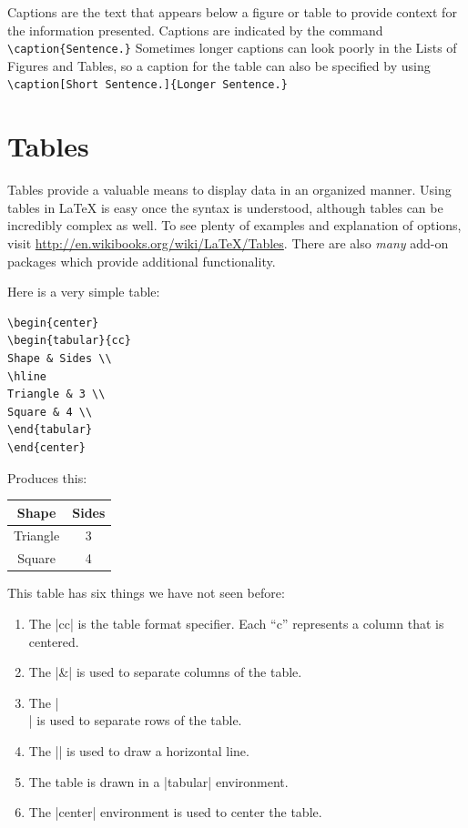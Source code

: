 Captions are the text that appears below a figure or table to provide context
for the information presented.  Captions are indicated by the command
\verb|\caption{Sentence.}| Sometimes longer captions can look poorly in the
Lists of Figures and Tables, so a caption for the table can also be specified
by using \verb|\caption[Short Sentence.]{Longer Sentence.}|

\section{Tables}

Tables provide a valuable means to display data in an organized manner.  Using
tables in \LaTeX{} is easy once the syntax is understood, although tables can
be incredibly complex as well.  To see plenty of examples and explanation of
options, visit \url{http://en.wikibooks.org/wiki/LaTeX/Tables}. There are also
\emph{many} add-on packages which provide additional functionality.

Here is a very simple table:

\begin{Verbatim}
\begin{center}
\begin{tabular}{cc}
Shape & Sides \\
\hline
Triangle & 3 \\
Square & 4 \\
\end{tabular}
\end{center}
\end{Verbatim}

Produces this:

\begin{center}
\begin{tabular}{cc}
Shape & Sides \\
\hline
Triangle & 3 \\
Square & 4 \\
\end{tabular}
\end{center}

This table has six things we have not seen before:

\begin{enumerate}
\item The |{cc}| is the table format specifier. Each ``c'' represents
  a column that is centered.
\item The |&| is used to separate columns of the table.
\item The |\\| is used to separate rows of the table.
\item The |\hline| is used to draw a horizontal line.
\item The table is drawn in a |tabular| environment.
\item The |center| environment is used to center the table.
\end{enumerate}

